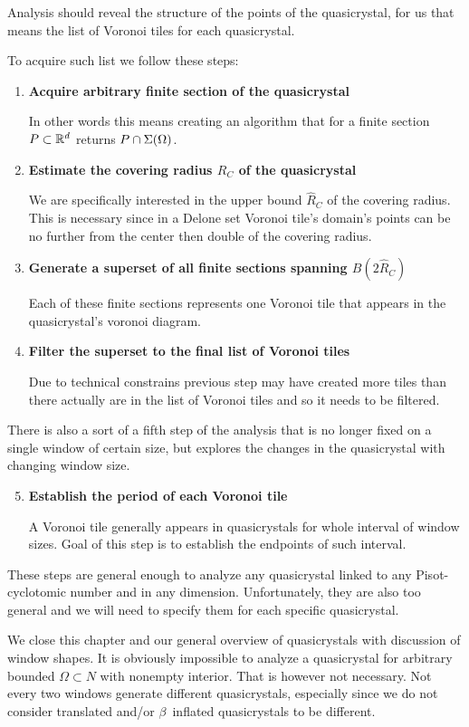 \documentclass[text.tex]{subfiles}
\begin{document}
Analysis should reveal the structure of the points of the quasicrystal, for us that means the list of Voronoi tiles for each quasicrystal. 

To acquire such list we follow these steps: 
\begin{enumerate}
\item \textbf{Acquire arbitrary finite section of the quasicrystal}

In other words this means creating an algorithm that for a finite section $P\subset\mathbb{R}^d$ returns $P\cap\Sigma(\Omega)$. 
\item \textbf{Estimate the covering radius $R_C$ of the quasicrystal}

We are specifically interested in the upper bound $\hat{R}_C$ of the covering radius. This is necessary since in a Delone set Voronoi tile's domain's points can be no further from the center then double of the covering radius. 
\item \textbf{Generate a superset of all finite sections spanning $B(2\hat{R}_C)$}

Each of these finite sections represents one Voronoi tile that appears in the quasicrystal's voronoi diagram. 
\item \textbf{Filter the superset to the final list of Voronoi tiles}

Due to technical constrains previous step may have created more tiles than there actually are in the list of Voronoi tiles and so it needs to be filtered. 
\end{enumerate}

There is also a sort of a fifth step of the analysis that is no longer fixed on a single window of certain size, but explores the changes in the quasicrystal with changing window size. 
\begin{enumerate}
\setcounter{enumi}{4}
\item \textbf{Establish the period of each Voronoi tile}

A Voronoi tile generally appears in quasicrystals for whole interval of window sizes. Goal of this step is to establish the endpoints of such interval. 
\end{enumerate}

These steps are general enough to analyze any quasicrystal linked to any Pisot-cyclotomic number and in any dimension. Unfortunately, they are also too general and we will need to specify them for each specific quasicrystal. 

We close this chapter and our general overview of quasicrystals with discussion of window shapes. It is obviously impossible to analyze a quasicrystal for arbitrary bounded $\Omega\subset N$ with nonempty interior. That is however not necessary. Not every two windows generate different quasicrystals, especially since we do not consider translated and/or $\beta$~inflated quasicrystals to be different. 
\end{document}

